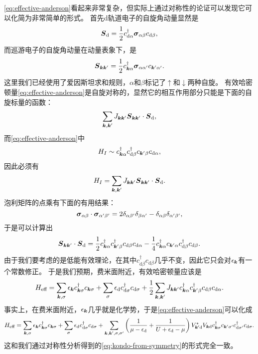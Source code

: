 \eqref{eq:effective-anderson}看起来非常复杂，但实际上通过对称性的论证可以发现它可以化简为非常简单的形式。
首先d轨道电子的自旋角动量显然是
\[
    {\vb*{S}}_\text{d} = \frac{1}{2} {c}_{\text{d} \alpha}^\dagger \vb*{\sigma}_{\alpha \beta} {c}_{\text{d} \beta},
\]
而巡游电子的自旋角动量在动量表象下，是
\[
    {\vb*{S}}_{\vb*{k} \vb*{k}'} = \frac{1}{2} {c}^\dagger_{\vb*{k} \alpha} \vb*{\sigma}_{\alpha \alpha'} {c}_{\vb*{k}' \alpha'}.
\]
这里我们已经使用了爱因斯坦求和规则，$\alpha$和$\beta$标记了$\uparrow$和$\downarrow$两种自旋。
有效哈密顿量\eqref{eq:effective-anderson}是自旋对称的，显然它的相互作用部分只能是下面的自旋标量的函数：
\[
    \sum_{\vb*{k}, \vb*{k}'} J_{\vb*{k} \vb*{k}'} {\vb*{S}}_{\vb*{k} \vb*{k}'} \cdot {\vb*{S}}_\text{d},
\]
而\eqref{eq:effective-anderson}中
\[
    {H}_I \sim {c}^\dagger_{\vb*{k} \alpha} {c}^\dagger_{\text{d} \beta} {c}_{\vb*{k}' \beta} {c}_{\text{d} \alpha},
\]
因此必须有
\[
    {H}_I = \sum_{\vb*{k}, \vb*{k}'} J_{\vb*{k} \vb*{k}'} {\vb*{S}}_{\vb*{k} \vb*{k}'} \cdot {\vb*{S}}_\text{d}.
\]
泡利矩阵的点乘有下面的有用结果：
\[
    \vb*{\sigma}_{\alpha \beta} \cdot \vb*{\sigma}_{\alpha' \beta'} = 2 \delta_{\alpha \beta'} \delta_{\beta \alpha'} - \delta_{\alpha \beta} \delta_{\alpha' \beta'},
\]
于是可以计算出
\[
    {\vb*{S}}_{\vb*{k} \vb*{k}'} \cdot {\vb*{S}}_\text{d} = \frac{1}{2} {c}^\dagger_{\vb*{k} \alpha} {c}^\dagger_{\vb*{k}' \beta} {c}_{\text{d} \beta} {c}_{\text{d} \alpha} - \frac{1}{4} {c}^\dagger_{\vb*{k} \alpha} {c}_{\vb*{k}' \alpha} {c}^\dagger_{\text{d} \beta} {c}_{\text{d} \beta}.
\]
由于我们要考虑的是低能有效理论，在其中${c}^\dagger_{\text{d} \beta} {c}_{\text{d} \beta}$几乎不变，因此它只会对$\epsilon_{\vb*{k}}$有一个常数修正。
于是我们预期，费米面附近，有效哈密顿量应该是
\begin{equation}
    {H}_\text{eff} = \sum_{\vb*{k}, \sigma} \epsilon_{\vb*{k}} {c}_{\vb*{k}\sigma}^\dagger {c}_{\vb*{k} \sigma} + \sum_\sigma \epsilon_\text{d} {c}_{\text{d}\sigma}^\dagger {c}_{\text{d} \sigma} + \frac{1}{2} \sum_{\vb*{k}, \vb*{k}'} J_{\vb*{k} \vb*{k}'} {c}^\dagger_{\vb*{k} \alpha} {c}^\dagger_{\vb*{k}' \beta} {c}_{\text{d} \beta} {c}_{\text{d} \alpha}.
    \label{eq:kondo-from-symmetry}
\end{equation}
事实上，在费米面附近，$\epsilon_{\vb*{k}}$几乎就是化学势，于是\eqref{eq:effective-anderson}可以化成
\[
    {H}_\text{eff} = \sum_{\vb*{k}, \sigma} \epsilon_{\vb*{k}} {c}_{\vb*{k}\sigma}^\dagger {c}_{\vb*{k} \sigma} + \sum_\sigma \epsilon_\text{d} {c}_{\text{d}\sigma}^\dagger {c}_{\text{d} \sigma} 
    + \sum_{\vb*{k}, \vb*{k}', \sigma, \sigma'} \left( \frac{1}{\mu - \epsilon_\text{d}} + \frac{1}{U + \epsilon_\text{d} - \mu} \right) V_{\vb*{k}' \text{d}}^* V_{\vb*{k} \text{d}} {c}^\dagger_{\vb*{k} \sigma} {c}_{\vb*{k}' \sigma'} {c}^\dagger_{\text{d} \sigma'} {c}_{\text{d} \sigma}.
\]
这和我们通过对称性分析得到的\eqref{eq:kondo-from-symmetry}的形式完全一致。

